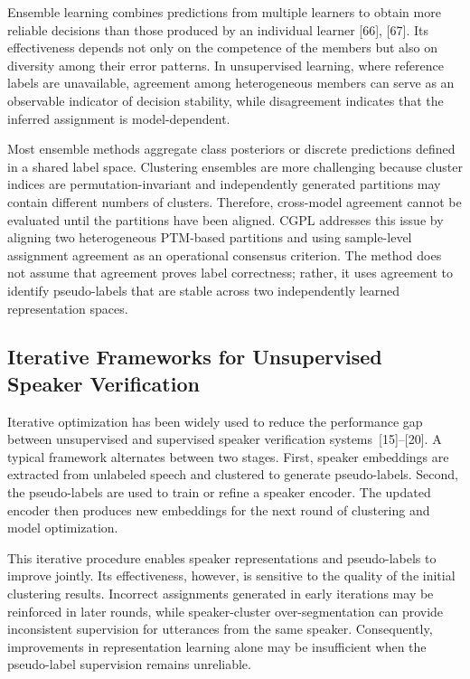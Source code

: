 \documentclass[journal]{IEEEtran}
\begin{document}
Ensemble learning combines predictions from multiple learners to obtain
more reliable decisions than those produced by an individual learner
[66], [67]. Its effectiveness depends not only on the competence of the
members but also on diversity among their error patterns. In unsupervised
learning, where reference labels are unavailable, agreement among
heterogeneous members can serve as an observable indicator of decision
stability, while disagreement indicates that the inferred assignment is
model-dependent.

Most ensemble methods aggregate class posteriors or discrete predictions
defined in a shared label space. Clustering ensembles are more challenging
because cluster indices are permutation-invariant and independently
generated partitions may contain different numbers of clusters. Therefore,
cross-model agreement cannot be evaluated until the partitions have been
aligned. CGPL addresses this issue by aligning two heterogeneous PTM-based
partitions and using sample-level assignment agreement as an operational
consensus criterion. The method does not assume that agreement proves label
correctness; rather, it uses agreement to identify pseudo-labels that are
stable across two independently learned representation spaces.

\subsection{Iterative Frameworks for Unsupervised Speaker Verification}

Iterative optimization has been widely used to reduce the performance
gap between unsupervised and supervised speaker verification
systems~[15]--[20]. A typical framework alternates between two
stages. First, speaker embeddings are extracted from unlabeled speech
and clustered to generate pseudo-labels. Second, the pseudo-labels
are used to train or refine a speaker encoder. The updated encoder
then produces new embeddings for the next round of clustering and
model optimization.

This iterative procedure enables speaker representations and
pseudo-labels to improve jointly. Its effectiveness, however, is
sensitive to the quality of the initial clustering results. Incorrect
assignments generated in early iterations may be reinforced in later
rounds, while speaker-cluster over-segmentation can provide
inconsistent supervision for utterances from the same speaker.
Consequently, improvements in representation learning alone may be
insufficient when the pseudo-label supervision remains unreliable.
\end{document}
